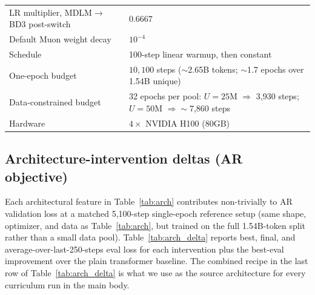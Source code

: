 \documentclass{article}
\begin{document}
\begin{table}[h]
\begin{tabular}{ll}
LR multiplier, MDLM$\to$BD3 post-switch & $0.6667$ \\
Default Muon weight decay & $10^{-4}$ \\
Schedule & 100-step linear warmup, then constant \\
\midrule
One-epoch budget & $10{,}100$ steps ($\sim$2.65B tokens; $\sim$1.7 epochs over 1.54B unique) \\
Data-constrained budget & 32 epochs per pool: $U{=}25$M $\Rightarrow$ 3{,}930 steps; $U{=}50$M $\Rightarrow{\sim}$7{,}860 steps \\
Hardware & $4 \times$ NVIDIA H100 (80GB) \\
\bottomrule
\end{tabular}
\end{table}

\subsection{Architecture-intervention deltas (AR objective)}

Each architectural feature in Table~\ref{tab:arch} contributes non-trivially to AR validation loss at a matched 5{,}100-step single-epoch reference setup (same shape, optimizer, and data as Table~\ref{tab:arch}, but trained on the full 1.54B-token split rather than a small data pool). Table~\ref{tab:arch_delta} reports best, final, and average-over-last-250-steps eval loss for each intervention plus the best-eval improvement over the plain transformer baseline. The combined recipe in the last row of Table~\ref{tab:arch_delta} is what we use as the source architecture for every curriculum run in the main body.
\end{document}
